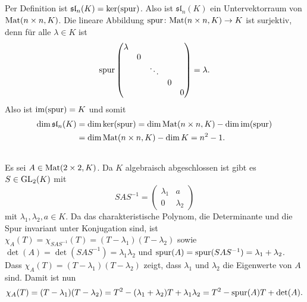 \documentclass[a4paper,10pt]{article}
\begin{document}
\subsection{}
Per Definition ist $\mathfrak{sl}_n(K) = \ker(\mathrm{spur})$. Also ist $\mathfrak{sl}_n(K)$ ein Untervektorraum von $\mathrm{Mat}(n \times n, K)$. Die lineare Abbildung $\mathrm{spur} \colon \mathrm{Mat}(n \times n, K) \to K$ ist surjektiv, denn für alle $\lambda \in K$ ist
\[
 \mathrm{spur}
 \begin{pmatrix}
  \lambda &   &        &   &   \\
          & 0 &        &   &   \\
          &   & \ddots &   &   \\
          &   &        & 0 &   \\
          &   &        &   & 0
 \end{pmatrix}
 = \lambda.
\]
Also ist $\mathrm{im}(\mathrm{spur}) = K$ und somit
\begin{align*}
 \dim \mathfrak{sl}_n(K)
 &= \dim \ker(\mathrm{spur})
 = \dim \mathrm{Mat}(n \times n, K) - \dim \mathrm{im}(\mathrm{spur}) \\
 &= \dim \mathrm{Mat}(n \times n, K) - \dim K
 = n^2 - 1.
\end{align*}


\subsection{}
Es sei $A \in \mathrm{Mat}(2 \times 2, K)$. Da $K$ algebraisch abgeschlossen ist gibt es $S \in \mathrm{GL}_2(K)$ mit
\[
 SAS^{-1} =
 \begin{pmatrix}
  \lambda_1 & a \\
  0         & \lambda_2
 \end{pmatrix}
\]
mit $\lambda_1, \lambda_2, a \in K$. Da das charakteristische Polynom, die Determinante und die Spur invariant unter Konjugation sind, ist $\chi_A(T) = \chi_{SAS^{-1}}(T) = (T-\lambda_1)(T-\lambda_2)$ sowie $\det(A) = \det(SAS^{-1}) = \lambda_1 \lambda_2$ und $\mathrm{spur}(A) = \mathrm{spur}(SAS^{-1}) = \lambda_1 + \lambda_2$. Dass $\chi_A(T) = (T-\lambda_1)(T-\lambda_2)$ zeigt, dass $\lambda_1$ und $\lambda_2$ die Eigenwerte von $A$ sind. Damit ist nun
\[
 \chi_A(T)
 = (T-\lambda_1)(T-\lambda_2)
 = T^2 - (\lambda_1 + \lambda_2)T + \lambda_1 \lambda_2
 = T^2 - \mathrm{spur}(A)T + \det(A).
\]
\end{document}
